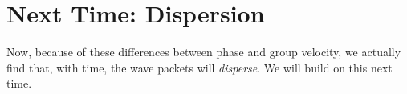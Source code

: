     \section{Next Time: Dispersion}
      Now, because of these differences between phase and group velocity, we actually find that, with time, the wave packets will \textit{disperse}. We will build on this next time.